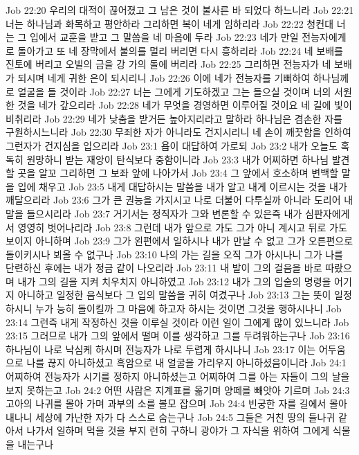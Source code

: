 Job 22:20  우리의 대적이 끊어졌고 그 남은 것이 불사른 바 되었다 하느니라
Job 22:21  너는 하나님과 화목하고 평안하라 그리하면 복이 네게 임하리라
Job 22:22  청컨대 너는 그 입에서 교훈을 받고 그 말씀을 네 마음에 두라
Job 22:23  네가 만일 전능자에게로 돌아가고 또 네 장막에서 불의를 멀리 버리면 다시 흥하리라
Job 22:24  네 보배를 진토에 버리고 오빌의 금을 강 가의 돌에 버리라
Job 22:25  그리하면 전능자가 네 보배가 되시며 네게 귀한 은이 되시리니
Job 22:26  이에 네가 전능자를 기뻐하여 하나님께로 얼굴을 들 것이라
Job 22:27  너는 그에게 기도하겠고 그는 들으실 것이며 너의 서원한 것을 네가 갚으리라
Job 22:28  네가 무엇을 경영하면 이루어질 것이요 네 길에 빛이 비취리라
Job 22:29  네가 낮춤을 받거든 높아지리라고 말하라 하나님은 겸손한 자를 구원하시느니라
Job 22:30  무죄한 자가 아니라도 건지시리니 네 손이 깨끗함을 인하여 그런자가 건지심을 입으리라
Job 23:1  욥이 대답하여 가로되
Job 23:2  내가 오늘도 혹독히 원망하니 받는 재앙이 탄식보다 중함이니라
Job 23:3  내가 어찌하면 하나님 발견할 곳을 알꼬 그리하면 그 보좌 앞에 나아가서
Job 23:4  그 앞에서 호소하며 변백할 말을 입에 채우고
Job 23:5  내게 대답하시는 말씀을 내가 알고 내게 이르시는 것을 내가 깨달으리라
Job 23:6  그가 큰 권능을 가지시고 나로 더불어 다투실까 아니라 도리어 내 말을 들으시리라
Job 23:7  거기서는 정직자가 그와 변론할 수 있은즉 내가 심판자에게서 영영히 벗어나리라
Job 23:8  그런데 내가 앞으로 가도 그가 아니 계시고 뒤로 가도 보이지 아니하며
Job 23:9  그가 왼편에서 일하시나 내가 만날 수 없고 그가 오른편으로 돌이키시나 뵈올 수 없구나
Job 23:10  나의 가는 길을 오직 그가 아시나니 그가 나를 단련하신 후에는 내가 정금 같이 나오리라
Job 23:11  내 발이 그의 걸음을 바로 따랐으며 내가 그의 길을 지켜 치우치지 아니하였고
Job 23:12  내가 그의 입술의 명령을 어기지 아니하고 일정한 음식보다 그 입의 말씀을 귀히 여겼구나
Job 23:13  그는 뜻이 일정하시니 누가 능히 돌이킬까 그 마음에 하고자 하시는 것이면 그것을 행하시나니
Job 23:14  그런즉 내게 작정하신 것을 이루실 것이라 이런 일이 그에게 많이 있느니라
Job 23:15  그러므로 내가 그의 앞에서 떨며 이를 생각하고 그를 두려워하는구나
Job 23:16  하나님이 나로 낙심케 하시며 전능자가 나로 두렵게 하시나니
Job 23:17  이는 어두움으로 나를 끊지 아니하셨고 흑암으로 내 얼굴을 가리우지 아니하셨음이니라
Job 24:1  어찌하여 전능자가 시기를 정하지 아니하셨는고 어찌하여 그를 아는 자들이 그의 날을 보지 못하는고
Job 24:2  어떤 사람은 지계표를 옮기며 양떼를 빼앗아 기르며
Job 24:3  고아의 나귀를 몰아 가며 과부의 소를 볼모 잡으며
Job 24:4  빈궁한 자를 길에서 몰아 내나니 세상에 가난한 자가 다 스스로 숨는구나
Job 24:5  그들은 거친 땅의 들나귀 같아서 나가서 일하며 먹을 것을 부지 런히 구하니 광야가 그 자식을 위하여 그에게 식물을 내는구나
